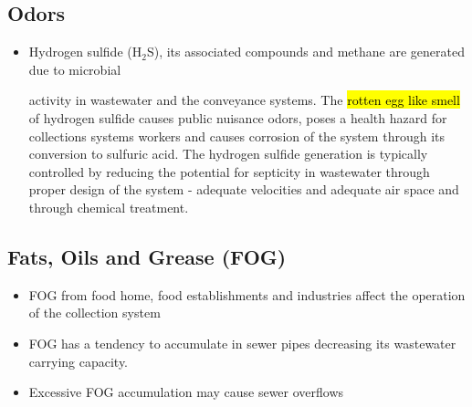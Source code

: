 \subsection{Odors}
\begin{itemize}
\item Hydrogen sulfide (H$_2$S), its associated compounds and methane are generated due to microbial

 activity in wastewater and the conveyance systems.  The \hl{rotten egg like smell} of hydrogen sulfide causes public nuisance odors, poses a health hazard for collections systems workers and causes corrosion of the system through its conversion to sulfuric acid.  The hydrogen sulfide generation is typically controlled by reducing the potential for septicity in wastewater through proper design of the system -  adequate velocities and adequate air space and through chemical treatment.
 \end{itemize}

\subsection{Fats, Oils and Grease (FOG)}
\begin{itemize}
\item FOG from food home, food establishments and industries affect the operation of the collection system
\item FOG has a tendency to accumulate in sewer pipes decreasing its wastewater carrying capacity.
\item Excessive FOG accumulation may cause sewer overflows
 \end{itemize}

